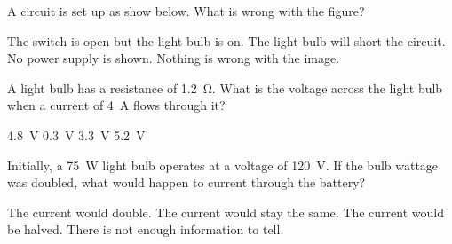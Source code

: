 \documentclass[]{exam}
\begin{document}
\begin{questions}

\question
A circuit is set up as show below.  What is wrong with the figure?

\begin{center}
\end{center}

\begin{randomizechoices}[keeplast]
    \correctchoice The switch is open but the light bulb is on.
    \choice  The light bulb will short the circuit.
    \choice No power supply is shown.
    \choice Nothing is wrong with the image.
\end{randomizechoices}

\question
A light bulb has a resistance of \SI{1.2}{\ohm}. What is the voltage across the light bulb when a current of \SI{4}{A} flows through it?

\begin{randomizeoneparchoices}
    \correctchoice \SI{4.8}{V}
    \choice \SI{0.3}{V}
    \choice \SI{3.3}{V}
    \choice \SI{5.2}{V}
\end{randomizeoneparchoices}

\clearpage

\question
Initially, a \SI{75}{W} light bulb operates at a voltage of \SI{120}{V}. If the bulb wattage was doubled, what would happen to current through the battery?

\begin{randomizechoices}[keeplast]
    \correctchoice The current would double.
    \choice The current would stay the same.
    \choice The current would be halved.
    \choice There is not enough information to tell.
\end{randomizechoices}


\end{questions}
\end{document}
